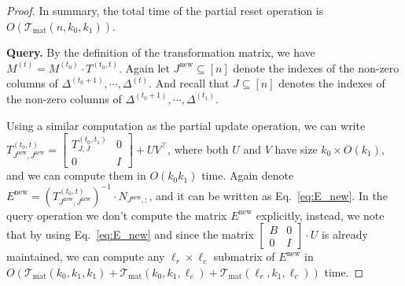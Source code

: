 \documentclass[11pt]{article}
\newcommand{\Tmat}{\mathcal{T}_{\mathrm{mat}}}
\newcommand{\new}{\mathrm{new}}
\newcommand\BB{\boldsymbol{\mathit{B}}}
\newcommand\EE{\boldsymbol{\mathit{E}}}
\newcommand\II{\boldsymbol{\mathit{I}}}
\newcommand\NN{\boldsymbol{\mathit{N}}}
\newcommand\MM{\boldsymbol{\mathit{M}}}
\newcommand\TT{\boldsymbol{\mathit{T}}}
\newcommand\UU{\boldsymbol{\mathit{U}}}
\newcommand\VV{\boldsymbol{\mathit{V}}}
\begin{document}
\begin{proof}
In summary, the total time of the partial reset operation is $O(\Tmat(n, k_0, k_1))$.

{\bf Query.} 
By the definition of the transformation matrix, we have $\MM^{(t)} = \MM^{(t_0)} \cdot \TT^{(t_0, t)}$. Again let $J^{\new} \subseteq [n]$ denote the indexes of the non-zero columns of $\Delta^{(t_0+1)}, \cdots, \Delta^{(t)}$. And recall that $J \subseteq [n]$ denotes the indexes of the non-zero columns of $\Delta^{(t_0+1)}, \cdots, \Delta^{(t_1)}$. 

Using a similar computation as the partial update operation, we can write $\TT^{(t_0,t)}_{J^{\new},J^{\new}} = \begin{bmatrix}
\TT^{(t_0,t_1)}_{J,J} & 0 \\
0 & \II
\end{bmatrix} + \UU \VV^{\top}$, where both $\UU$ and $\VV$ have size $k_0 \times O(k_1)$, and we can compute them in $O(k_0 k_1)$ time. Again denote $\EE^{\new} = (\TT^{(t_0,t)}_{J^{\new},J^{\new}})^{-1} \cdot \NN_{J^{\new},:}$, and it can be written as Eq.~\eqref{eq:E_new}. In the query operation we don't compute the matrix $\EE^{\new}$ explicitly, instead, we note that by using Eq.~\eqref{eq:E_new} and since the matrix $\begin{bmatrix}
\BB & 0 \\
0 & \II
\end{bmatrix} \cdot \UU$ is already maintained, we can compute any $\ell_r \times \ell_c$ submatrix of $\EE^{\new}$ in $O(\Tmat(k_0, k_1, k_1) + \Tmat(k_0, k_1, \ell_c) + \Tmat(\ell_r, k_1, \ell_c))$ time.



\end{proof}
\end{document}
